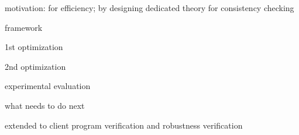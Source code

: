 
\begin{frame}
	motivation: for efficiency; by designing dedicated theory for consistency checking
\end{frame}

\begin{frame}
	framework
\end{frame}

\begin{frame}
	1st optimization
\end{frame}

\begin{frame}
	2nd optimization
\end{frame}

\begin{frame}
	experimental evaluation
\end{frame}

\begin{frame}
	what needs to do next
\end{frame}

\begin{frame}
	extended to client program verification and robustness verification
\end{frame}
